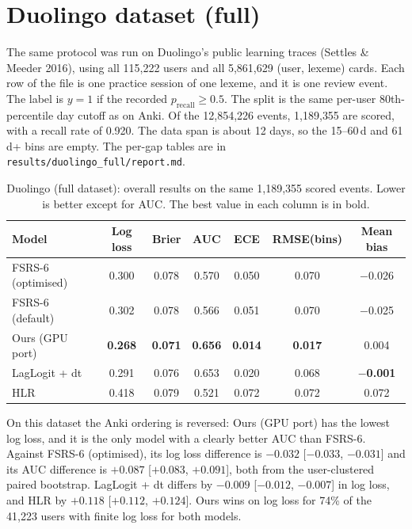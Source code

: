 \documentclass[11pt,a4paper]{article}
\newcommand{\best}[1]{\textbf{#1}}
\begin{document}
\section{Duolingo dataset (full)}
The same protocol was run on Duolingo's public learning traces (Settles \& Meeder 2016), using all 115{,}222 users and all 5{,}861{,}629 (user, lexeme) cards. Each row of the file is one practice session of one lexeme, and it is one review event. The label is $y=1$ if the recorded $p_\text{recall}\geq 0.5$. The split is the same per-user 80th-percentile day cutoff as on Anki. Of the 12{,}854{,}226 events, 1{,}189{,}355 are scored, with a recall rate of 0.920. The data span is about 12 days, so the 15--60\,d and 61\,d+ bins are empty. The per-gap tables are in \texttt{results/duolingo\_full/report.md}.

\begin{table}[H]
\centering
\caption{Duolingo (full dataset): overall results on the same 1{,}189{,}355 scored events. Lower is better except for AUC. The best value in each column is in bold.}
\label{tab:duo}
\begin{tabular}{lcccccc}
\toprule
Model & Log loss & Brier & AUC & ECE & RMSE(bins) & Mean bias \\
\midrule
FSRS-6 (optimised) & 0.300 & 0.078 & 0.570 & 0.050 & 0.070 & $-$0.026 \\
FSRS-6 (default)   & 0.302 & 0.078 & 0.566 & 0.051 & 0.070 & $-$0.025 \\
Ours (GPU port)    & \best{0.268} & \best{0.071} & \best{0.656} & \best{0.014} & \best{0.017} & 0.004 \\
LagLogit + dt      & 0.291 & 0.076 & 0.653 & 0.020 & 0.068 & \best{$-$0.001} \\
HLR                & 0.418 & 0.079 & 0.521 & 0.072 & 0.072 & 0.072 \\
\bottomrule
\end{tabular}
\end{table}

On this dataset the Anki ordering is reversed: Ours (GPU port) has the lowest log loss, and it is the only model with a clearly better AUC than FSRS-6. Against FSRS-6 (optimised), its log loss difference is $-0.032$ [$-0.033$, $-0.031$] and its AUC difference is $+0.087$ [$+0.083$, $+0.091$], both from the user-clustered paired bootstrap. LagLogit + dt differs by $-0.009$ [$-0.012$, $-0.007$] in log loss, and HLR by $+0.118$ [$+0.112$, $+0.124$]. Ours wins on log loss for 74\% of the 41{,}223 users with finite log loss for both models.
\end{document}
